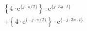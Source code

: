 \[
\begin{split}
&  \left \{ 4 \cdot \textrm{e}^{\{  j \cdot \pi/2 \}} \right \} \cdot \textrm{e}^{\{  j \cdot 3\pi \cdot t \}}\\
&+ \left \{ 4 \cdot \textrm{e}^{\{ -j \cdot \pi/2 \}} \right \} \cdot \textrm{e}^{\{- j \cdot 3\pi \cdot t \}}
\end{split}
\]
